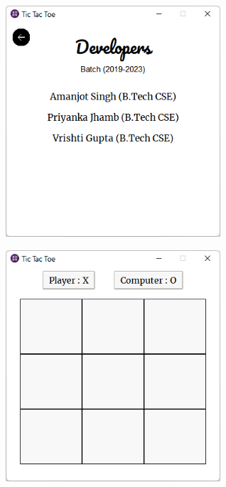 \includegraphics[width=8cm, height=9cm]{figures/developers_page.png}
\hfill
\includegraphics[width=8cm, height=9cm]{figures/GameBoard_page.png}

\vspace{10pt}

